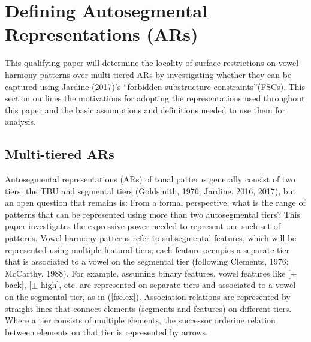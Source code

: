 \documentclass[,doc,floatsintext]{apa6}
\theoremstyle{definition}
\theoremstyle{definition}
\theoremstyle{definition}
\theoremstyle{remark}
\begin{document}
\section{Defining Autosegmental Representations
(ARs)}\label{defining-autosegmental-representations-ars}

This qualifying paper will determine the locality of surface
restrictions on vowel harmony patterns over multi-tiered ARs by
investigating whether they can be captured using Jardine (2017)'s
\enquote{forbidden substructure constraints}(FSCs). This section
outlines the motivations for adopting the representations used
throughout this paper and the basic assumptions and definitions needed
to use them for analysis.

\subsection{Multi-tiered ARs}\label{multi-tiered-ars}

Autosegmental representations (ARs) of tonal patterns generally consist
of two tiers: the TBU and segmental tiers (Goldsmith, 1976; Jardine,
2016, 2017), but an open question that remains is: From a formal
perspective, what is the range of patterns that can be represented using
more than two autosegmental tiers? This paper investigates the
expressive power needed to represent one such set of patterns. Vowel
harmony patterns refer to subsegmental features, which will be
represented using multiple featural tiers; each feature occupies a
separate tier that is associated to a vowel on the segmental tier
(following Clements, 1976; McCarthy, 1988). For example, assuming binary
features, vowel features like {[}\(\pm\) back{]}, {[}\(\pm\) high{]},
etc. are represented on separate tiers and associated to a vowel on the
segmental tier, as in (\ref{fsc.ex}). Association relations are
represented by straight lines that connect elements (segments and
features) on different tiers. Where a tier consists of multiple
elements, the successor ordering relation between elements on that tier
is represented by arrows.

\begin{exe}
\ex \label{fsc.ex}
\end{exe}
\end{document}
